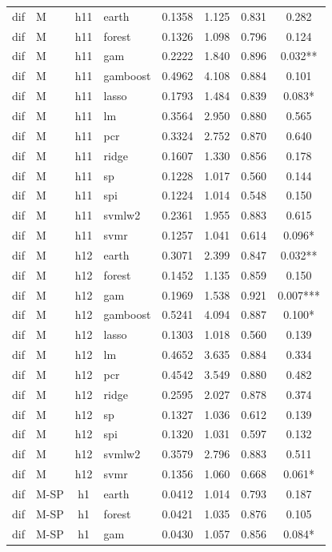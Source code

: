 \begin{ThreePartTable}
\begin{longtable}[t]{llclcccc}
\addlinespace
dif & M & h11 & earth & 0.1358 & 1.125 & 0.831 & 0.282\\
dif & M & h11 & forest & 0.1326 & 1.098 & 0.796 & 0.124\\
dif & M & h11 & gam & 0.2222 & 1.840 & 0.896 & 0.032**\\
dif & M & h11 & gamboost & 0.4962 & 4.108 & 0.884 & 0.101\\
dif & M & h11 & lasso & 0.1793 & 1.484 & 0.839 & 0.083*\\
dif & M & h11 & lm & 0.3564 & 2.950 & 0.880 & 0.565\\
dif & M & h11 & pcr & 0.3324 & 2.752 & 0.870 & 0.640\\
dif & M & h11 & ridge & 0.1607 & 1.330 & 0.856 & 0.178\\
dif & M & h11 & sp & 0.1228 & 1.017 & 0.560 & 0.144\\
dif & M & h11 & spi & 0.1224 & 1.014 & 0.548 & 0.150\\
dif & M & h11 & svmlw2 & 0.2361 & 1.955 & 0.883 & 0.615\\
dif & M & h11 & svmr & 0.1257 & 1.041 & 0.614 & 0.096*\\
\addlinespace
dif & M & h12 & earth & 0.3071 & 2.399 & 0.847 & 0.032**\\
dif & M & h12 & forest & 0.1452 & 1.135 & 0.859 & 0.150\\
dif & M & h12 & gam & 0.1969 & 1.538 & 0.921 & 0.007***\\
dif & M & h12 & gamboost & 0.5241 & 4.094 & 0.887 & 0.100*\\
dif & M & h12 & lasso & 0.1303 & 1.018 & 0.560 & 0.139\\
dif & M & h12 & lm & 0.4652 & 3.635 & 0.884 & 0.334\\
dif & M & h12 & pcr & 0.4542 & 3.549 & 0.880 & 0.482\\
dif & M & h12 & ridge & 0.2595 & 2.027 & 0.878 & 0.374\\
dif & M & h12 & sp & 0.1327 & 1.036 & 0.612 & 0.139\\
dif & M & h12 & spi & 0.1320 & 1.031 & 0.597 & 0.132\\
dif & M & h12 & svmlw2 & 0.3579 & 2.796 & 0.883 & 0.511\\
dif & M & h12 & svmr & 0.1356 & 1.060 & 0.668 & 0.061*\\
\addlinespace
dif & M-SP & h1 & earth & 0.0412 & 1.014 & 0.793 & 0.187\\
dif & M-SP & h1 & forest & 0.0421 & 1.035 & 0.876 & 0.105\\
dif & M-SP & h1 & gam & 0.0430 & 1.057 & 0.856 & 0.084*\\

\end{longtable}
\end{ThreePartTable}
